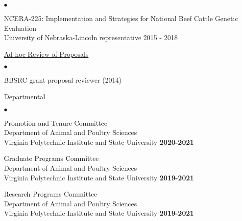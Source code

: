 \documentclass[margin,line,10pt]{res}
\newenvironment{list2}{
  \begin{list}{$\bullet$}{%
      \setlength{\itemsep}{0in}
      \setlength{\parsep}{0in} \setlength{\parskip}{0in}
      \setlength{\topsep}{0in} \setlength{\partopsep}{0in} 
      \setlength{\leftmargin}{0.2in}}}{\end{list}}
\begin{document}
\begin{resume}
\begin{list2}

\item NCERA-225: Implementation and Strategies for National Beef Cattle Genetic Evaluation \\ University of Nebraska-Lincoln representative \hfill  2015 - 2018\\
\end{list2}




\begin{flushleft}
\hspace{0.3cm} \underline{Ad hoc Review of Proposals}
\end{flushleft}
\begin{list2}
\item BBSRC grant proposal reviewer (2014)
\end{list2}

\begin{flushleft}
  \hspace{0.3cm} \underline{Departmental}
\end{flushleft}
\begin{list2}

\item Promotion and Tenure Committee \\
  Department of Animal and Poultry Sciences \\ Virginia Polytechnic Institute and State University   \hfill \textbf{2020-2021}\\

    \vspace{0.3cm}
    
\item Graduate Programs Committee \\
  Department of Animal and Poultry Sciences \\ Virginia Polytechnic Institute and State University   \hfill \textbf{2019-2021}\\

  \vspace{0.3cm}
  
\item Research Programs Committee \\
  Department of Animal and Poultry Sciences \\ Virginia Polytechnic Institute and State University  \hfill \textbf{2019-2021}\\


\end{list2}
\end{resume}
\end{document}
